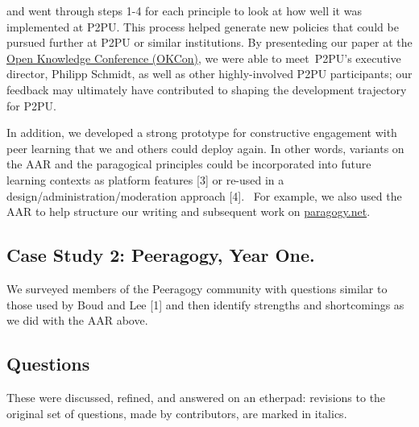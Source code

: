 and went through steps 1-4 for each principle to look at how well it was
implemented at P2PU. This process helped generate new policies that
could be pursued further at P2PU or similar institutions. By
presenteding our paper at the \href{http://okfn.org/okcon/}{Open
Knowledge Conference (OKCon)}, we were able to meet~P2PU's executive
director, Philipp Schmidt, as well as other highly-involved P2PU
participants; our feedback may ultimately have contributed to shaping
the development trajectory for P2PU.

In addition, we developed a strong prototype for constructive engagement
with peer learning that we and others could deploy again. In other
words, variants on the AAR and the paragogical principles could be
incorporated into future learning contexts as platform features
{{[}3{]}} or re-used in a design/administration/moderation approach
{{[}4{]}}.~ For example, we also used the AAR to help structure our
writing and subsequent work on \href{http://paragogy.net}{paragogy.net}.

\subsection{Case Study 2: Peeragogy, Year
One.}\label{case-study-2-peeragogy-year-one.}

We surveyed members of the Peeragogy community with questions similar to
those used by Boud and Lee {{[}1{]}} and then identify strengths and
shortcomings as we did with the AAR above.

\subsection{Questions}\label{questions}

These were discussed, refined, and answered on an etherpad: revisions to
the original set of questions, made by contributors, are marked in
italics.

